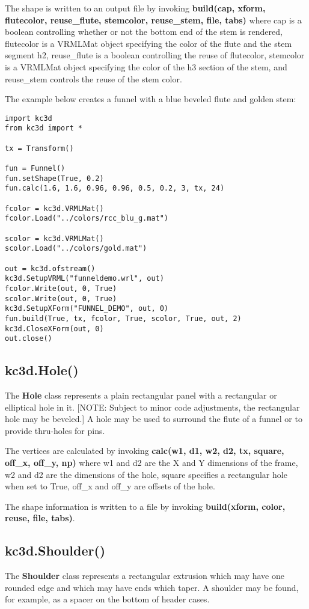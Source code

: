 \documentclass[a4paper, dvipdfm]{article}
\begin{document}
The shape is written to an output file by invoking \textbf{build(cap, xform, flutecolor,
reuse\_flute, stemcolor, reuse\_stem, file, tabs)} where cap is a boolean controlling
whether or not the bottom end of the stem is rendered, flutecolor is a VRMLMat object
specifying the color of the flute and the stem segment h2, reuse\_flute is a boolean
controlling the reuse of flutecolor, stemcolor is a VRMLMat object specifying the color
of the h3 section of the stem, and reuse\_stem controls the reuse of the stem color.

The example below creates a funnel with a blue beveled flute and golden stem:

\begin{verbatim}
import kc3d
from kc3d import *

tx = Transform()

fun = Funnel()
fun.setShape(True, 0.2)
fun.calc(1.6, 1.6, 0.96, 0.96, 0.5, 0.2, 3, tx, 24)

fcolor = kc3d.VRMLMat()
fcolor.Load("../colors/rcc_blu_g.mat")

scolor = kc3d.VRMLMat()
scolor.Load("../colors/gold.mat")

out = kc3d.ofstream()
kc3d.SetupVRML("funneldemo.wrl", out)
fcolor.Write(out, 0, True)
scolor.Write(out, 0, True)
kc3d.SetupXForm("FUNNEL_DEMO", out, 0)
fun.build(True, tx, fcolor, True, scolor, True, out, 2)
kc3d.CloseXForm(out, 0)
out.close()
\end{verbatim}

\subsection{kc3d.Hole()}
The \textbf{Hole} class represents a plain rectangular panel with a rectangular or elliptical
hole in it. [NOTE: Subject to minor code adjustments, the rectangular hole may be beveled.]
A hole may be used to surround the flute of a funnel or to provide thru-holes for pins.

The vertices are calculated by invoking \textbf{calc(w1, d1, w2, d2, tx, square, off\_x, off\_y, np)}
where w1 and d2 are the X and Y dimensions of the frame, w2 and d2 are the dimensions of the
hole, square specifies a rectangular hole when set to True, off\_x and off\_y are offsets of
the hole.

The shape information is written to a file by invoking \textbf{build(xform, color, reuse, file, tabs)}.

\subsection{kc3d.Shoulder()}
The \textbf{Shoulder} class represents a rectangular extrusion which may have one rounded edge
and which may have ends which taper. A shoulder may be found, for example, as a spacer on the
bottom of header cases.
\end{document}
